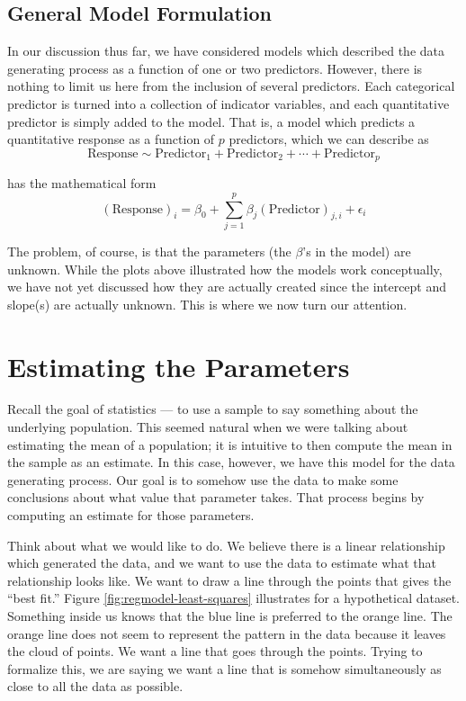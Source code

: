 \documentclass[]{book}
\theoremstyle{definition}
\theoremstyle{definition}
\theoremstyle{definition}
\theoremstyle{remark}
\begin{document}
\subsection{General Model Formulation}\label{general-model-formulation}

In our discussion thus far, we have considered models which described
the data generating process as a function of one or two predictors.
However, there is nothing to limit us here from the inclusion of several
predictors. Each categorical predictor is turned into a collection of
indicator variables, and each quantitative predictor is simply added to
the model. That is, a model which predicts a quantitative response as a
function of \(p\) predictors, which we can describe as
\[\text{Response} \sim \text{Predictor}_1 + \text{Predictor}_2 + \dotsb + \text{Predictor}_p\]

has the mathematical form
\[(\text{Response})_i = \beta_0 + \sum_{j=1}^{p} \beta_j (\text{Predictor})_{j,i} + \epsilon_i\]

The problem, of course, is that the parameters (the \(\beta\)'s in the
model) are unknown. While the plots above illustrated how the models
work conceptually, we have not yet discussed how they are actually
created since the intercept and slope(s) are actually unknown. This is
where we now turn our attention.

\section{Estimating the Parameters}\label{estimating-the-parameters}

Recall the goal of statistics --- to use a sample to say something about
the underlying population. This seemed natural when we were talking
about estimating the mean of a population; it is intuitive to then
compute the mean in the sample as an estimate. In this case, however, we
have this model for the data generating process. Our goal is to somehow
use the data to make some conclusions about what value that parameter
takes. That process begins by computing an estimate for those
parameters.

Think about what we would like to do. We believe there is a linear
relationship which generated the data, and we want to use the data to
estimate what that relationship looks like. We want to draw a line
through the points that gives the ``best fit.'' Figure
\ref{fig:regmodel-least-squares} illustrates for a hypothetical dataset.
Something inside us knows that the blue line is preferred to the orange
line. The orange line does not seem to represent the pattern in the data
because it leaves the cloud of points. We want a line that goes through
the points. Trying to formalize this, we are saying we want a line that
is somehow simultaneously as close to all the data as possible.
\end{document}
